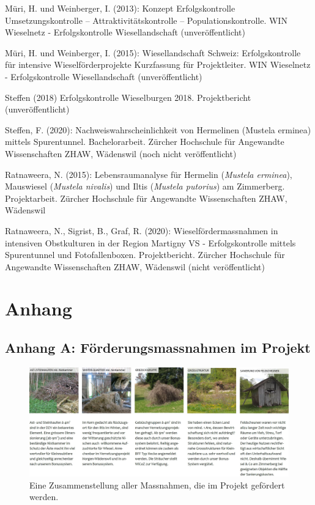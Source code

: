 \documentclass[
]{scrbook}
\begin{document}
Müri, H. und Weinberger, I. (2013): Konzept Erfolgskontrolle Umsetzungskontrolle -- Attraktivitätskontrolle -- Populationskontrolle. WIN Wieselnetz - Erfolgskontrolle Wiesellandschaft (unveröffentlicht)

Müri, H. und Weinberger, I. (2015): Wiesellandschaft Schweiz: Erfolgskontrolle für intensive Wieselförderprojekte Kurzfassung für Projektleiter. WIN Wieselnetz - Erfolgskontrolle Wiesellandschaft (unveröffentlicht)

Steffen (2018) Erfolgskontrolle Wieselburgen 2018. Projektbericht (unveröffentlicht)

Steffen, F. (2020): Nachweiswahrscheinlichkeit von Hermelinen (Mustela erminea) mittels Spurentunnel. Bachelorarbeit. Zürcher Hochschule für Angewandte Wissenschaften ZHAW, Wädenswil (noch nicht veröffentlicht)

Ratnaweera, N. (2015): Lebensraumanalyse für Hermelin (\emph{Mustela erminea}), Mauswiesel (\emph{Mustela nivalis}) und Iltis (\emph{Mustela putorius}) am Zimmerberg. Projektarbeit. Zürcher Hochschule für Angewandte Wissenschaften ZHAW, Wädenswil

Ratnaweera, N., Sigrist, B., Graf, R. (2020): Wieselfördermassnahmen in intensiven Obstkulturen in der Region Martigny VS - Erfolgskontrolle mittels Spurentunnel und Fotofallenboxen. Projektbericht. Zürcher Hochschule für Angewandte Wissenschaften ZHAW, Wädenswil (nicht veröffentlicht)

\hypertarget{anhang}{%
\chapter{Anhang}\label{anhang}}

\hypertarget{anhang-massnahmen}{%
\section{Anhang A: Förderungsmassnahmen im Projekt}\label{anhang-massnahmen}}



\begin{figure}
\includegraphics[width=1\linewidth]{images/massnahmen} \caption{Eine Zusammenstellung aller Massnahmen, die im Projekt gefördert werden.}\label{fig:massnahmen}
\end{figure}
\end{document}
